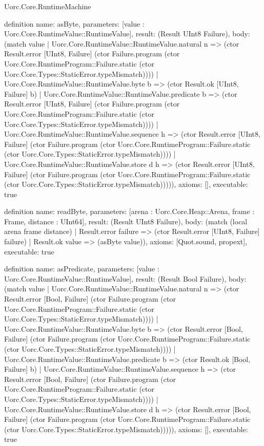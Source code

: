 \begin{lexlean}{Uorc.Core.RuntimeMachine}
\begin{semanticmodule}
definition{
  name: asByte,
  parameters: [value : Uorc.Core.RuntimeValue::RuntimeValue],
  result: (Result UInt8 Failure),
  body: (match value
    | Uorc.Core.RuntimeValue::RuntimeValue.natural n => (ctor Result.error [UInt8, Failure] (ctor Failure.program (ctor Uorc.Core.RuntimeProgram::Failure.static (ctor Uorc.Core.Types::StaticError.typeMismatch))))
    | Uorc.Core.RuntimeValue::RuntimeValue.byte b => (ctor Result.ok [UInt8, Failure] b)
    | Uorc.Core.RuntimeValue::RuntimeValue.predicate b => (ctor Result.error [UInt8, Failure] (ctor Failure.program (ctor Uorc.Core.RuntimeProgram::Failure.static (ctor Uorc.Core.Types::StaticError.typeMismatch))))
    | Uorc.Core.RuntimeValue::RuntimeValue.sequence h => (ctor Result.error [UInt8, Failure] (ctor Failure.program (ctor Uorc.Core.RuntimeProgram::Failure.static (ctor Uorc.Core.Types::StaticError.typeMismatch))))
    | Uorc.Core.RuntimeValue::RuntimeValue.store d h => (ctor Result.error [UInt8, Failure] (ctor Failure.program (ctor Uorc.Core.RuntimeProgram::Failure.static (ctor Uorc.Core.Types::StaticError.typeMismatch))))),
  axioms: [],
  executable: true
}

definition{
  name: readByte,
  parameters: [arena : Uorc.Core.Heap::Arena, frame : Frame, distance : UInt64],
  result: (Result UInt8 Failure),
  body: (match (local arena frame distance)
    | Result.error failure => (ctor Result.error [UInt8, Failure] failure)
    | Result.ok value => (asByte value)),
  axioms: [Quot.sound, propext],
  executable: true
}

definition{
  name: asPredicate,
  parameters: [value : Uorc.Core.RuntimeValue::RuntimeValue],
  result: (Result Bool Failure),
  body: (match value
    | Uorc.Core.RuntimeValue::RuntimeValue.natural n => (ctor Result.error [Bool, Failure] (ctor Failure.program (ctor Uorc.Core.RuntimeProgram::Failure.static (ctor Uorc.Core.Types::StaticError.typeMismatch))))
    | Uorc.Core.RuntimeValue::RuntimeValue.byte b => (ctor Result.error [Bool, Failure] (ctor Failure.program (ctor Uorc.Core.RuntimeProgram::Failure.static (ctor Uorc.Core.Types::StaticError.typeMismatch))))
    | Uorc.Core.RuntimeValue::RuntimeValue.predicate b => (ctor Result.ok [Bool, Failure] b)
    | Uorc.Core.RuntimeValue::RuntimeValue.sequence h => (ctor Result.error [Bool, Failure] (ctor Failure.program (ctor Uorc.Core.RuntimeProgram::Failure.static (ctor Uorc.Core.Types::StaticError.typeMismatch))))
    | Uorc.Core.RuntimeValue::RuntimeValue.store d h => (ctor Result.error [Bool, Failure] (ctor Failure.program (ctor Uorc.Core.RuntimeProgram::Failure.static (ctor Uorc.Core.Types::StaticError.typeMismatch))))),
  axioms: [],
  executable: true
}


\end{semanticmodule}
\end{lexlean}
